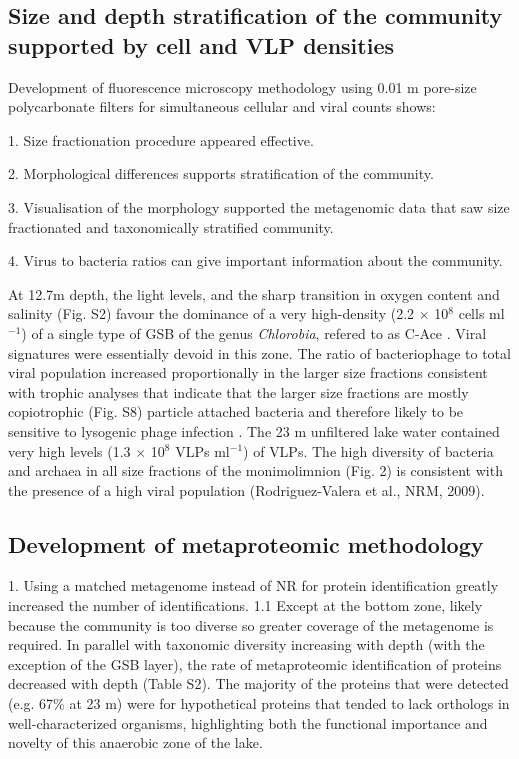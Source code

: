 \subsection[Community stratification supported by cell and VLP densities]{Size and depth stratification of the community supported by cell and \ac{VLP} densities}
Development of fluorescence microscopy methodology using 0.01 \textmu{}m pore-size polycarbonate filters for simultaneous cellular and viral counts shows:

1. Size fractionation procedure appeared effective.

2. Morphological differences supports stratification of the community.

3. Visualisation of the morphology supported the metagenomic data that saw size fractionated and taxonomically stratified community.

4. Virus to bacteria ratios can give important information about the community.

At 12.7m depth, the light levels, and the sharp transition in oxygen content and salinity (Fig. S2) favour the dominance of a very high-density (2.2 $\times$ 10$^8$ cells ml$^{-1}$) of a single type of \ac{GSB} of the genus \emph{Chlorobia}, refered to as C-Ace \cite{Ng2010a}. 
Viral signatures were essentially devoid in this zone. 
The ratio of bacteriophage to total viral population increased proportionally in the larger size fractions consistent with trophic analyses that indicate that the larger size fractions are mostly copiotrophic (Fig. S8) particle attached bacteria and therefore likely to be sensitive to lysogenic phage infection \cite{Lauro2009}. 
The 23 m unfiltered lake water contained very high levels (1.3 $\times$ 10$^8$ \acp{VLP} ml$^{-1}$) of \acp{VLP}. 
The high diversity of bacteria and archaea in all size fractions of the monimolimnion (Fig. 2) is consistent with the presence of a high viral population (Rodriguez-Valera et al., NRM, 2009).


\subsection{Development of metaproteomic methodology}

1. Using a matched metagenome instead of \ac{NR} for protein identification greatly increased the number of identifications.
1.1 Except at the bottom zone, likely because the community is too diverse so greater coverage of the metagenome is required. %
In parallel with taxonomic diversity increasing with depth (with the exception of the GSB layer), the rate of metaproteomic identification of proteins decreased with depth (Table S2). 
The majority of the proteins that were detected (e.g. 67\% at 23 m) were for hypothetical proteins that tended to lack orthologs in well-characterized organisms, highlighting both the functional importance and novelty of this anaerobic zone of the lake.


